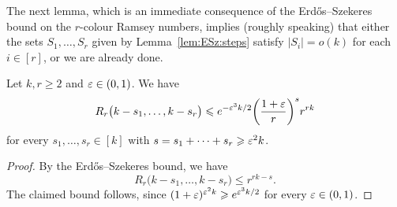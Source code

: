 The next lemma, which is an immediate consequence of the Erd\H{o}s--Szekeres bound on the \(r\)-colour Ramsey numbers, implies (roughly speaking) that either the sets \(S_1,\dots,S_r\) given by Lemma~\ref{lem:ESz:steps} satisfy \(|S_i| = o(k)\) for each \(i \in [r]\), or we are already done.
%
\begin{lemma}
  \label{lem:many:ESz:steps} %
  Let \(k,r \ge 2\) and \(\varepsilon \in (0,1)\). We have 
  \begin{equation*}
    R_r\big( k - s_1, \ldots, k - s_r \big) \leqslant e^{-\varepsilon^3 k / 2} \bigg( \frac{1+\varepsilon}{r} \bigg)^s r^{rk}
  \end{equation*}
  for every \(s_1,\ldots,s_r \in [k]\) with \(s = s_1 + \cdots + s_r \geqslant \varepsilon^2 k\).
\end{lemma}
%
\begin{proof}
  By the Erd\H{o}s--Szekeres bound, we have
  \begin{equation*}
    R_r\big( k - s_1, \ldots, k - s_r \big) \le r^{rk - s}.
  \end{equation*}
  The claimed bound follows, since \(( 1 + \varepsilon )^{\varepsilon^2 k} \geqslant e^{\varepsilon^3 k/2}\) for every \(\varepsilon \in (0,1)\).
\end{proof}

